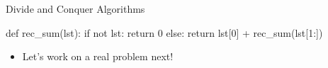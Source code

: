 \documentclass[
  ignorenonframetext,
]{beamer}
\newenvironment{Shaded}{\begin{snugshade}}{\end{snugshade}}
\newcommand{\ControlFlowTok}[1]{\textcolor[rgb]{0.00,0.23,0.31}{#1}}
\newcommand{\DecValTok}[1]{\textcolor[rgb]{0.68,0.00,0.00}{#1}}
\newcommand{\KeywordTok}[1]{\textcolor[rgb]{0.00,0.23,0.31}{#1}}
\newcommand{\NormalTok}[1]{\textcolor[rgb]{0.00,0.23,0.31}{#1}}
\newcommand{\OperatorTok}[1]{\textcolor[rgb]{0.37,0.37,0.37}{#1}}
\providecommand{\tightlist}{%
  \setlength{\itemsep}{0pt}\setlength{\parskip}{0pt}}\usepackage{longtable,booktabs,array}
\begin{document}
\begin{frame}[fragile]{Divide and Conquer Algorithms}
\protect\hypertarget{divide-and-conquer-algorithms-2}{}
\begin{Shaded}
\begin{Highlighting}[]
\KeywordTok{def}\NormalTok{ rec\_sum(lst):}
  \ControlFlowTok{if} \KeywordTok{not}\NormalTok{ lst:}
    \ControlFlowTok{return} \DecValTok{0}
  \ControlFlowTok{else}\NormalTok{:}
    \ControlFlowTok{return}\NormalTok{ lst[}\DecValTok{0}\NormalTok{] }\OperatorTok{+}\NormalTok{ rec\_sum(lst[}\DecValTok{1}\NormalTok{:])}
\end{Highlighting}
\end{Shaded}

\begin{itemize}
\tightlist
\item
  Let's work on a real problem next!
\end{itemize}
\end{frame}
\end{document}
